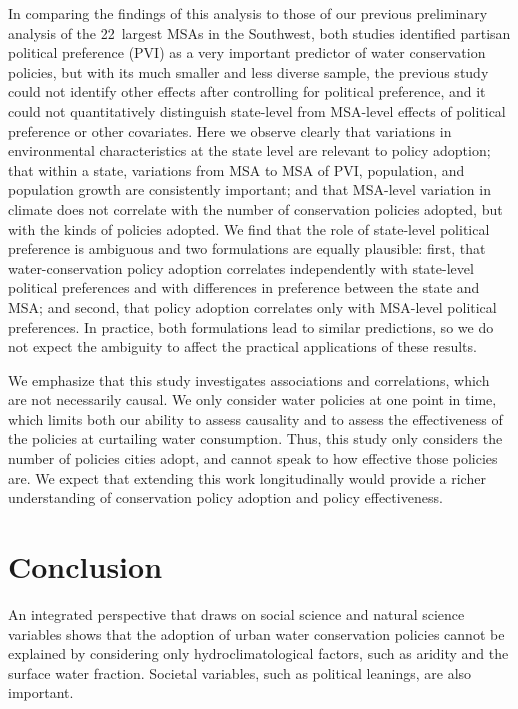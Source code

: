 \documentclass[draft,linenumbers]{agujournal}
\begin{document}
In comparing the findings of this analysis to those of our previous preliminary
analysis of the 22~largest MSAs in the Southwest, both studies identified
partisan political preference (PVI)
as a very important predictor of water conservation policies, but with its much
smaller and less diverse sample, the previous study could not identify other
effects after controlling for
political preference,
and it could not quantitatively distinguish state-level from MSA-level effects of
political preference
or other covariates.
Here we observe clearly that variations in
environmental
characteristics at the state level are relevant to policy adoption;
that within a state, variations from MSA to MSA of PVI, population,
and population growth are consistently important;
and that MSA-level variation in climate does not correlate with the number of
conservation policies adopted, but with the kinds of policies adopted.
We find that the role of state-level political preference is ambiguous and two formulations
are equally plausible: first, that water-conservation policy adoption correlates independently with
state-level political preferences and with differences in preference between the state and MSA;
and second, that policy adoption correlates only with MSA-level political preferences.
In practice, both formulations lead to similar predictions, so we do not expect the ambiguity to
affect the practical applications of these results.

We emphasize that this study investigates associations and correlations, which
are not necessarily causal.
We only consider water policies at one point in time, which limits both our
ability to assess causality and to assess the effectiveness of the policies
at curtailing water consumption.
Thus, this study only considers the number of
policies cities adopt, and cannot speak to how effective those policies are.
We expect that extending this work longitudinally would provide a richer
understanding of conservation policy adoption and policy effectiveness.

\section{Conclusion}
An integrated perspective that draws on social science and natural science
variables shows that the adoption of urban water conservation policies cannot be
explained by considering only hydroclimatological factors, such as aridity and
the surface water fraction. Societal variables, such as political leanings, are
also important.
\end{document}
